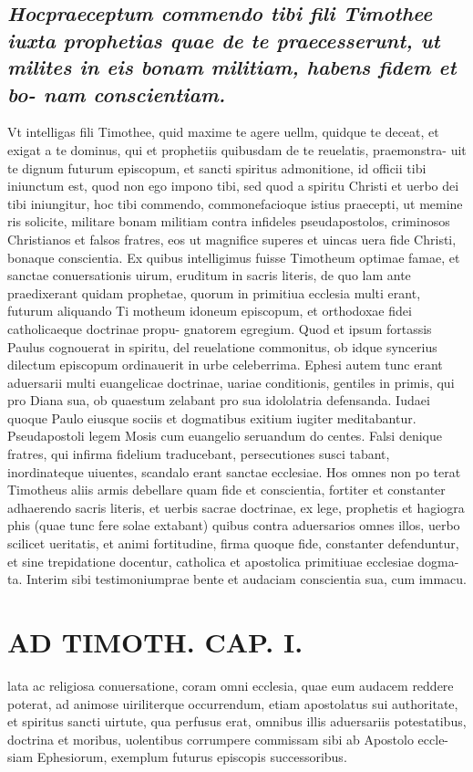 \documentclass{article}
\begin{document}
\begin{pages}
\subsection*{\textit{Hocpraeceptum commendo tibi fili Timothee iuxta prophetias quae de te praecesserunt, ut milites in eis bonam militiam, habens fidem et bo- nam conscientiam. }}\pstart Vt intelligas fili Timothee, quid maxime te agere uellm, quidque te deceat, et exigat a te dominus, qui et prophetiis quibusdam de te reuelatis, praemonstra- uit te dignum futurum episcopum, et sancti spiritus admonitione, id officii tibi iniunctum est, quod non ego impono tibi, sed quod a spiritu Christi et uerbo dei tibi iniungitur, hoc tibi commendo, commonefacioque istius praecepti, ut memine ris solicite, militare bonam militiam contra infideles pseudapostolos, criminosos Christianos et falsos fratres, eos ut magnifice superes et uincas uera fide Christi, bonaque conscientia. Ex quibus intelligimus fuisse Timotheum optimae famae, et sanctae conuersationis uirum, eruditum in sacris literis, de quo lam ante praedixerant quidam prophetae, quorum in primitiua ecclesia multi erant, futurum aliquando Ti motheum idoneum episcopum, et orthodoxae fidei catholicaeque doctrinae propu- gnatorem egregium. Quod et ipsum fortassis Paulus cognouerat in spiritu, del reuelatione commonitus, ob idque syncerius dilectum episcopum ordinauerit in urbe celeberrima. Ephesi autem tunc erant aduersarii multi euangelicae doctrinae, uariae conditionis, gentiles in primis, qui pro Diana sua, ob quaestum zelabant pro sua idololatria defensanda. Iudaei quoque Paulo eiusque sociis et dogmatibus exitium iugiter meditabantur. Pseudapostoli legem Mosis cum euangelio seruandum do centes. Falsi denique fratres, qui infirma fidelium traducebant, persecutiones susci tabant, inordinateque uiuentes, scandalo erant sanctae ecclesiae. Hos omnes non po terat Timotheus aliis armis debellare quam fide et conscientia, fortiter et constanter adhaerendo sacris literis, et uerbis sacrae doctrinae, ex lege, prophetis et hagiogra phis (quae tunc fere solae extabant) quibus contra aduersarios omnes illos, uerbo scilicet ueritatis, et animi fortitudine, firma quoque fide, constanter defenduntur, et sine trepidatione docentur, catholica et apostolica primitiuae ecclesiae dogma- ta. Interim sibi testimoniumprae bente et audaciam conscientia sua, cum immacu.  \pend
\section*{AD TIMOTH. CAP. I. }
\marginpar{[ p.479 ]}\pstart lata ac religiosa conuersatione, coram omni ecclesia, quae eum audacem reddere poterat, ad animose uiriliterque occurrendum, etiam apostolatus sui authoritate, et spiritus sancti uirtute, qua perfusus erat, omnibus illis aduersariis potestatibus, doctrina et moribus, uolentibus corrumpere commissam sibi ab Apostolo eccle- siam Ephesiorum, exemplum futurus episcopis successoribus.  \pend
{}
{}

\end{pages}
\end{document}
